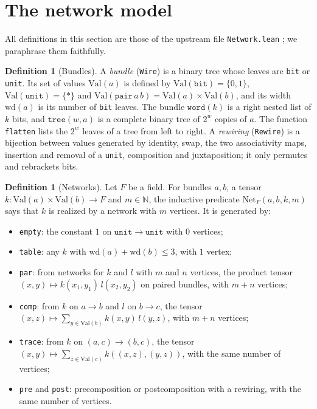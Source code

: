 \documentclass[11pt]{amsart}
\theoremstyle{definition}
\newtheorem{definition}[theorem]{Definition}
\theoremstyle{remark}
\newcommand{\N}{\mathbb{N}}
\newcommand{\lean}[1]{\texttt{#1}}
\newcommand{\Net}{\mathrm{Net}}
\newcommand{\Val}{\mathrm{Val}}
\newcommand{\wdt}{\mathrm{wd}}
\begin{document}
\section{The network model}\label{sec:model}

All definitions in this section are those of the upstream file \lean{Network.lean} \cite{OAImath}; we paraphrase them faithfully.

\begin{definition}[Bundles]
A \emph{bundle} (\lean{Wire}) is a binary tree whose leaves are \lean{bit} or \lean{unit}. Its set of values $\Val(a)$ is defined by $\Val(\mathtt{bit})=\{0,1\}$, $\Val(\mathtt{unit})=\{\ast\}$ and $\Val(\mathtt{pair}\,a\,b)=\Val(a)\times\Val(b)$, and its width $\wdt(a)$ is its number of \lean{bit} leaves. The bundle $\mathtt{word}(k)$ is a right nested list of $k$ bits, and $\mathtt{tree}(w,a)$ is a complete binary tree of $2^w$ copies of $a$. The function \lean{flatten} lists the $2^w$ leaves of a tree from left to right. A \emph{rewiring} (\lean{Rewire}) is a bijection between values generated by identity, swap, the two associativity maps, insertion and removal of a \lean{unit}, composition and juxtaposition; it only permutes and rebrackets bits.
\end{definition}

\begin{definition}[Networks]\label{def:net}
Let $F$ be a field. For bundles $a,b$, a tensor $k\colon\Val(a)\times\Val(b)\to F$ and $m\in\N$, the inductive predicate $\Net_F(a,b,k,m)$ says that $k$ is realized by a network with $m$ vertices. It is generated by:
\begin{itemize}
\item \lean{empty}: the constant $1$ on $\mathtt{unit}\to\mathtt{unit}$ with $0$ vertices;
\item \lean{table}: any $k$ with $\wdt(a)+\wdt(b)\le 3$, with $1$ vertex;
\item \lean{par}: from networks for $k$ and $l$ with $m$ and $n$ vertices, the product tensor $(x,y)\mapsto k(x_1,y_1)\,l(x_2,y_2)$ on paired bundles, with $m+n$ vertices;
\item \lean{comp}: from $k$ on $a\to b$ and $l$ on $b\to c$, the tensor $(x,z)\mapsto\sum_{y\in\Val(b)}k(x,y)\,l(y,z)$, with $m+n$ vertices;
\item \lean{trace}: from $k$ on $(a,c)\to(b,c)$, the tensor $(x,y)\mapsto\sum_{z\in\Val(c)}k((x,z),(y,z))$, with the same number of vertices;
\item \lean{pre} and \lean{post}: precomposition or postcomposition with a rewiring, with the same number of vertices.
\end{itemize}
\end{definition}
\end{document}
